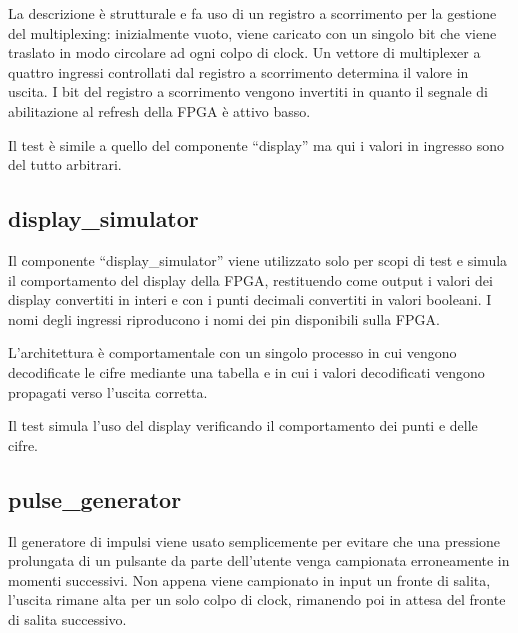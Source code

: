 \documentclass [11pt,a4paper,oneside,draft]{article}
\begin{document}


La descrizione è strutturale e fa uso di un registro a scorrimento
per la gestione del multiplexing: inizialmente vuoto, viene caricato
con un singolo bit che viene traslato in modo circolare ad ogni colpo
di clock. Un vettore di multiplexer a quattro ingressi controllati
dal registro a scorrimento determina il valore in uscita. I bit
del registro a scorrimento vengono invertiti in quanto il segnale
di abilitazione al refresh della FPGA è attivo basso.



Il test è simile a quello del componente ``display'' ma qui i valori in
ingresso sono del tutto arbitrari.

\subsection{display\_simulator}

Il componente ``display\_simulator'' viene utilizzato solo per scopi di
test e simula il comportamento del display della FPGA, restituendo come
output i valori dei display convertiti in interi e con i punti decimali
convertiti in valori booleani. I nomi degli ingressi riproducono i nomi
dei pin disponibili sulla FPGA.



L'architettura è comportamentale con un singolo processo in cui vengono
decodificate le cifre mediante una tabella e in cui i valori decodificati
vengono propagati verso l'uscita corretta.



Il test simula l'uso del display verificando il comportamento dei punti e
delle cifre.

\subsection{pulse\_generator}

Il generatore di impulsi viene usato semplicemente per evitare che una
pressione prolungata di un pulsante da parte dell'utente venga
campionata erroneamente in momenti successivi. Non appena viene
campionato in input un fronte di salita, l'uscita rimane alta per un solo
colpo di clock, rimanendo poi in attesa del fronte di salita successivo.
\end{document}
